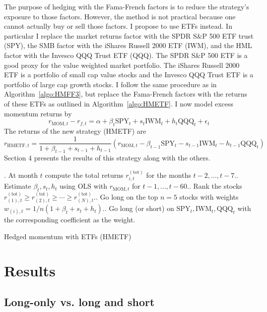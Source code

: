 \documentclass[10pt, letterpaper]{article}
\begin{document}
The purpose of hedging with the Fama-French factors is to reduce the strategy's exposure to those factors.  However, the method is not practical because one cannot actually buy or sell those factors.  I propose to use ETFs instead.  In particular I replace the market returns factor with the SPDR S\&P 500 ETF trust (SPY), the SMB factor with the iShares Russell 2000 ETF (IWM), and the HML factor with the Invesco QQQ Trust ETF (QQQ).  The SPDR S\&P 500 ETF is a good proxy for the value weighted market portfolio.  The iShares Russell 2000 ETF is a portfolio of small cap value stocks and the Invesco QQQ Trust ETF is a portfolio of large cap growth stocks.  I follow the same procedure as in Algorithm~\ref{algo:HMFF3}, but replace the Fama-French factors with the returns of these ETFs as outlined in Algorithm~\ref{algo:HMETF}.  I now model excess momentum returns by
\[
r_{\text{MOM},t} - r_{f,t} = \alpha + \beta_t \text{SPY}_t + s_t \text{IWM}_t + h_t \text{QQQ}_t + \epsilon_t
\]
The returns of the new strategy (HMETF) are
\[
r_{\text{HMETF}, t} = \frac{1}{1 + \beta_{t-1} + s_{t-1} + h_{t-1}} \left( r_{\text{MOM},t} - \beta_{t-1} \text{SPY}_t  - s_{t-1} \text{IWM}_t - h_{t-1} \text{QQQ}_t   \right)
\]
Section 4 presents the results of this strategy along with the others.


\begin{algorithm}[H]
.  At month $t$ compute the total returns $r^{(\text{tot})}_{i,t}$ for the months $t - 2,\ldots,t - 7$.. Estimate $\beta_t, s_t, h_t$ using OLS with $r_{\text{MOM},t}$ for $t-1,\ldots,t-60$..  Rank the stocks $r^{(\text{tot})}_{(1),t} \ge r^{(\text{tot})}_{(2),t} \ge \cdots \ge r^{(\text{tot})}_{(N),t}$..  Go long on the top $n = 5$ stocks with weights $w_{(i),t} = 1/n(1 + \beta_t + s_t + h_t)$.. Go long (or short) on $\text{SPY}_t, \text{IWM}_t, \text{QQQ}_t$ with the corresponding coefficient as the weight.
 \caption{Hedged momentum with ETFs (HMETF)}
 \label{algo:HMETF}
\end{algorithm}





\section{Results}


\subsection{Long-only vs. long and short}
\end{document}
